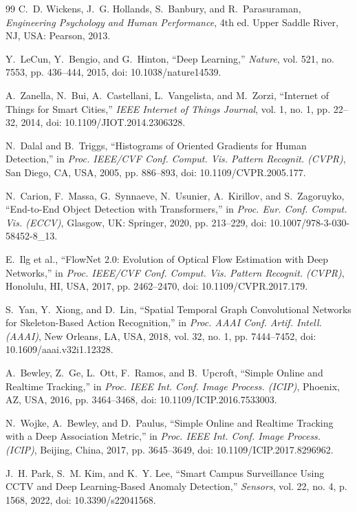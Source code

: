 \documentclass[conference]{IEEEtran}
\begin{document}
\begin{thebibliography}{99}
C.~D. Wickens, J.~G. Hollands, S.~Banbury, and R.~Parasuraman,
\textit{Engineering Psychology and Human Performance},
4th ed. Upper Saddle River, NJ, USA: Pearson, 2013.

Y.~LeCun, Y.~Bengio, and G.~Hinton,
``Deep Learning,''
\textit{Nature}, vol. 521, no. 7553, pp. 436--444, 2015, doi: 10.1038/nature14539.

A.~Zanella, N.~Bui, A.~Castellani, L.~Vangelista, and M.~Zorzi,
``Internet of Things for Smart Cities,''
\textit{IEEE Internet of Things Journal}, vol. 1, no. 1, pp. 22--32, 2014, doi: 10.1109/JIOT.2014.2306328.

N.~Dalal and B.~Triggs,
``Histograms of Oriented Gradients for Human Detection,''
in \textit{Proc. IEEE/CVF Conf. Comput. Vis. Pattern Recognit. (CVPR)},
San Diego, CA, USA, 2005, pp. 886--893, doi: 10.1109/CVPR.2005.177.

N.~Carion, F.~Massa, G.~Synnaeve, N.~Usunier, A.~Kirillov, and S.~Zagoruyko,
``End-to-End Object Detection with Transformers,''
in \textit{Proc. Eur. Conf. Comput. Vis. (ECCV)},
Glasgow, UK: Springer, 2020, pp. 213--229, doi: 10.1007/978-3-030-58452-8\_13.

E.~Ilg et al.,
``FlowNet 2.0: Evolution of Optical Flow Estimation with Deep Networks,''
in \textit{Proc. IEEE/CVF Conf. Comput. Vis. Pattern Recognit. (CVPR)},
Honolulu, HI, USA, 2017, pp. 2462--2470, doi: 10.1109/CVPR.2017.179.

S.~Yan, Y.~Xiong, and D.~Lin,
``Spatial Temporal Graph Convolutional Networks for Skeleton-Based Action Recognition,''
in \textit{Proc. AAAI Conf. Artif. Intell. (AAAI)},
New Orleans, LA, USA, 2018, vol. 32, no. 1, pp. 7444--7452, doi: 10.1609/aaai.v32i1.12328.

A.~Bewley, Z.~Ge, L.~Ott, F.~Ramos, and B.~Upcroft,
``Simple Online and Realtime Tracking,''
in \textit{Proc. IEEE Int. Conf. Image Process. (ICIP)},
Phoenix, AZ, USA, 2016, pp. 3464--3468, doi: 10.1109/ICIP.2016.7533003.

N.~Wojke, A.~Bewley, and D.~Paulus,
``Simple Online and Realtime Tracking with a Deep Association Metric,''
in \textit{Proc. IEEE Int. Conf. Image Process. (ICIP)},
Beijing, China, 2017, pp. 3645--3649, doi: 10.1109/ICIP.2017.8296962.

J.~H. Park, S.~M. Kim, and K.~Y. Lee,
``Smart Campus Surveillance Using CCTV and Deep Learning-Based Anomaly Detection,''
\textit{Sensors}, vol. 22, no. 4, p. 1568, 2022, doi: 10.3390/s22041568.


\end{thebibliography}
\end{document}
